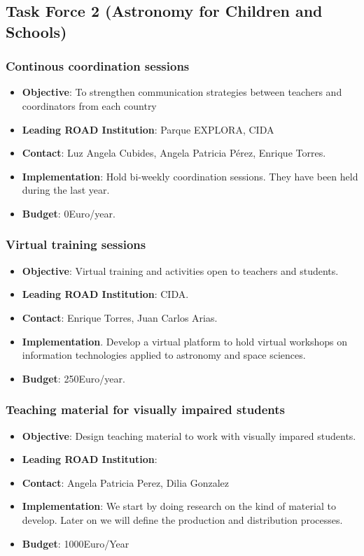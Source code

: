 \documentclass[12pt]{article}
\begin{document}
\subsection{Task Force 2 (Astronomy for Children and Schools)}




\subsubsection{Continous coordination sessions}

\begin{itemize}

\item{\bf Objective}: To strengthen communication  strategies between
  teachers  and coordinators from each  country
\item{\bf Leading ROAD Institution}: Parque EXPLORA, CIDA
\item{\bf Contact}: Luz Angela Cubides,  Angela Patricia  P\'erez,
  Enrique  Torres.
\item{\bf Implementation}: Hold bi-weekly coordination sessions. They
  have been held during the last year.
\item{\bf Budget}: 0Euro/year.
\end{itemize}


\subsubsection{Virtual training sessions}
\begin{itemize}
\item {\bf Objective}: Virtual training and activities open to
  teachers and students. 
\item {\bf Leading ROAD Institution}: CIDA.
\item {\bf Contact}: Enrique Torres, Juan Carlos Arias.
\item {\bf Implementation}. Develop a virtual platform to hold virtual
  workshops on information technologies applied to astronomy and space
  sciences.
\item {\bf Budget}: 250Euro/year.
\end{itemize}

\subsubsection{Teaching material for visually impaired students}
\begin{itemize}
\item {\bf Objective}: Design teaching material to work with visually
  impared students. 
\item {\bf Leading ROAD Institution}: 
\item {\bf Contact}: Angela Patricia Perez, Dilia Gonzalez
\item {\bf Implementation}: We start by doing research on the kind of
  material to develop. Later on we will define the production and
  distribution processes. 
\item {\bf Budget}: 1000Euro/Year
\end{itemize}
\end{document}
